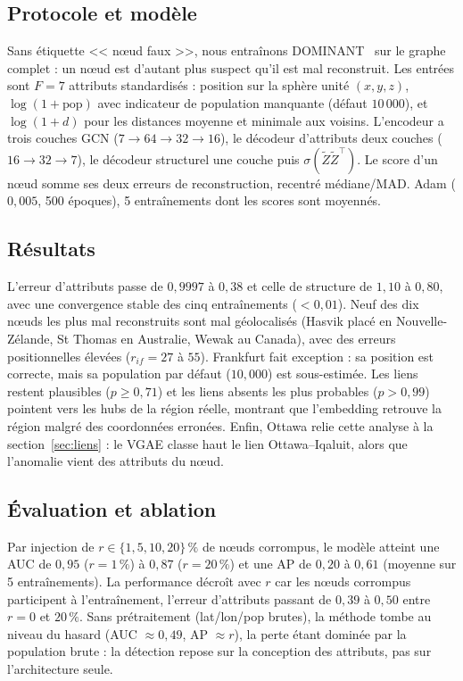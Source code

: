 \subsection{Protocole et modèle}

Sans étiquette << nœud faux >>, nous entraînons DOMINANT~\cite{ding2019dominant}
sur le graphe complet : un nœud est d'autant plus suspect qu'il est mal
reconstruit. Les entrées sont $F=7$ attributs standardisés : position sur la
sphère unité $(x,y,z)$, $\log(1+\text{pop})$ avec indicateur de population
manquante (défaut $10\,000$), et $\log(1+d)$ pour les distances moyenne et
minimale aux voisins. L'encodeur a trois couches GCN ($7\to64\to32\to16$), le
décodeur d'attributs deux couches ($16\to32\to7$), le décodeur structurel une
couche puis $\sigma(\tilde Z\tilde Z^\top)$. Le score d'un nœud somme ses deux
erreurs de reconstruction, recentré médiane/MAD. Adam ($0{,}005$, 500 époques),
5 entraînements dont les scores sont moyennés.

\subsection{Résultats}

L'erreur d'attributs passe de $0{,}9997$ à $0{,}38$ et celle de structure de $1{,}10$ à $0{,}80$, avec une convergence stable des cinq entraînements ($<0{,}01$). Neuf des dix nœuds les plus mal reconstruits sont mal géolocalisés (Hasvik placé en Nouvelle-Zélande, St Thomas en Australie, Wewak au Canada), avec des erreurs positionnelles élevées ($r_{if}=27$ à $55$). Frankfurt fait exception : sa position est correcte, mais sa population par défaut ($10,000$) est sous-estimée. Les liens restent plausibles ($p\geq0{,}71$) et les liens absents les plus probables ($p>0{,}99$) pointent vers les hubs de la région réelle, montrant que l'embedding retrouve la région malgré des coordonnées erronées. Enfin, Ottawa relie cette analyse à la section~\ref{sec:liens} : le VGAE classe haut le lien Ottawa--Iqaluit, alors que l'anomalie vient des attributs du nœud.


\subsection{Évaluation et ablation}

Par injection de $r\in\{1,5,10,20\}\,\%$ de nœuds corrompus, le modèle atteint
une AUC de $0{,}95$ ($r=1\,\%$) à $0{,}87$ ($r=20\,\%$) et une AP de $0{,}20$
à $0{,}61$ (moyenne sur 5 entraînements). La performance décroît avec $r$ car
les nœuds corrompus participent à l'entraînement, l'erreur d'attributs passant
de $0{,}39$ à $0{,}50$ entre $r=0$ et $20\,\%$. Sans prétraitement
(lat/lon/pop brutes), la méthode tombe au niveau du hasard (AUC $\approx0{,}49$,
AP $\approx r$), la perte étant dominée par la population brute : la détection
repose sur la conception des attributs, pas sur l'architecture seule.